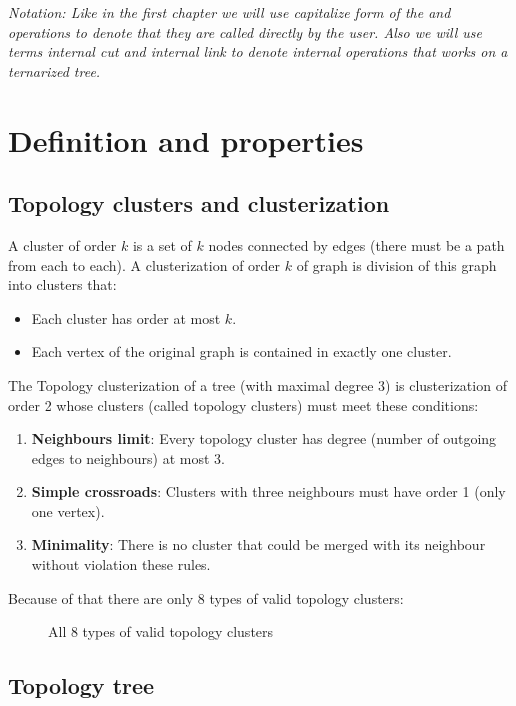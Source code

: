 {\it Notation: Like in the first chapter we will use capitalize form of the
\Cut{} and \Link{} operations to denote that they are called directly by the
user. Also we will use terms {\sl internal cut} and {\sl internal link} to
denote internal operations that works on a ternarized tree.}

\section{Definition and properties}

\subsection{Topology clusters and clusterization}

A {\I cluster of order $k$} is a set of $k$ nodes connected by edges (there must
be a path from each to each). A {\I clusterization of order $k$} of graph is
division of this graph into clusters that:
\begin{itemize}
\item Each cluster has order at most $k$.
\item Each vertex of the original graph is contained in exactly one cluster.
\end{itemize}

The {\I Topology clusterization} of a tree (with maximal degree 3) is clusterization
of order 2 whose clusters (called {\I topology clusters}) must meet these conditions:
\begin{enumerate}
\item {\bf Neighbours limit}: Every topology cluster has degree (number of
outgoing edges to neighbours) at most 3.
\item {\bf Simple crossroads}: Clusters with three neighbours must have order 1 (only one vertex).
\item {\bf Minimality}: There is no cluster that could be merged with its neighbour
without violation these rules.
\end{enumerate}

Because of that there are only 8 types of valid topology clusters:

\begin{figure}[H]
\centering
{}
\caption{All 8 types of valid topology clusters}
\end{figure}

\subsection{Topology tree}

